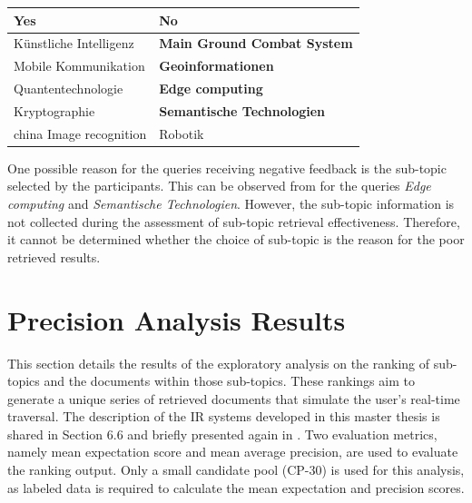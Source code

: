 \begin{center}
	\label{tab:queries_question_5}
	\begin{tabularx}{.8\textwidth}{|Y|Y|}
		\hline
		Yes & No \\
		\hline
		Künstliche Intelligenz  & \textbf{Main Ground Combat System} \\
		\hline
		Mobile Kommunikation & \textbf{Geoinformationen} \\
		\hline
		Quantentechnologie & \textbf{Edge computing} \\
		\hline
		Kryptographie & \textbf{Semantische Technologien} \\
		\hline
		china Image recognition & Robotik \\
		\hline
	\end{tabularx}
\end{center} 

One possible reason for the queries receiving negative feedback is the sub-topic selected by the participants. This can be observed from  for the queries \emph{Edge computing} and \emph{Semantische Technologien}. However, the sub-topic information is not collected during the assessment of sub-topic retrieval effectiveness. Therefore, it cannot be determined whether the choice of sub-topic is the reason for the poor retrieved results.


\section{Precision Analysis Results}

This section details the results of the exploratory analysis on the ranking of sub-topics and the documents within those sub-topics. These rankings aim to generate a unique series of retrieved documents that simulate the user's real-time traversal. The description of the \ac{IR} systems developed in this master thesis is shared in Section 6.6 and briefly presented again in . Two evaluation metrics, namely mean expectation score and mean average precision, are used to evaluate the ranking output. Only a small candidate pool (CP-30) is used for this analysis, as labeled data is required to calculate the mean expectation and precision scores.


